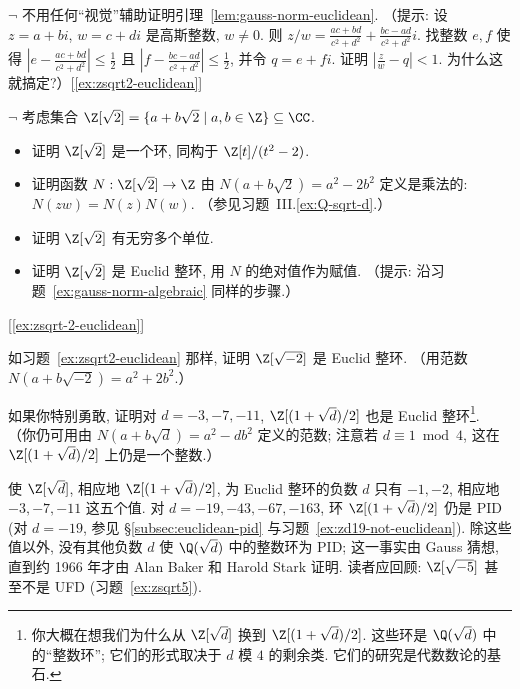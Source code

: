 \begin{prob}
\label{ex:gauss-norm-algebraic}
$\neg$ 不用任何``视觉''辅助证明引理~\ref{lem:gauss-norm-euclidean}. （提示: 设 $z=a+bi$, $w=c+di$ 是高斯整数, $w\neq 0$. 则 $z/w=\frac{ac+bd}{c^2+d^2}+\frac{bc-ad}{c^2+d^2}i$. 找整数 $e,f$ 使得 $|e-\frac{ac+bd}{c^2+d^2}|\leq\frac{1}{2}$ 且 $|f-\frac{bc-ad}{c^2+d^2}|\leq\frac{1}{2}$, 并令 $q=e+fi$. 证明 $|\frac{z}{w}-q|<1$. 为什么这就搞定?）[\ref{ex:zsqrt2-euclidean}]
\end{prob}

\begin{prob}
\label{ex:zsqrt2-euclidean}
$\neg$ 考虑集合 $\Z[\sqrt{2}]=\{a+b\sqrt{2}\mid a,b\in\Z\}\subseteq\CC$.
\begin{itemize}
\item 证明 $\Z[\sqrt{2}]$ 是一个环, 同构于 $\Z[t]/(t^2-2)$.
\item 证明函数 $N:\Z[\sqrt{2}]\to\Z$ 由 $N(a+b\sqrt{2})=a^2-2b^2$ 定义是乘法的: $N(zw)=N(z)N(w)$. （参见习题~III.\ref{ex:Q-sqrt-d}.）
\item 证明 $\Z[\sqrt{2}]$ 有无穷多个单位.
\item 证明 $\Z[\sqrt{2}]$ 是 Euclid 整环, 用 $N$ 的绝对值作为赋值. （提示: 沿习题~\ref{ex:gauss-norm-algebraic} 同样的步骤.）
\end{itemize}
[\ref{ex:zsqrt-2-euclidean}]
\end{prob}

\begin{prob}
\label{ex:zsqrt-2-euclidean}
如习题~\ref{ex:zsqrt2-euclidean} 那样, 证明 $\Z[\sqrt{-2}]$ 是 Euclid 整环. （用范数 $N(a+b\sqrt{-2})=a^2+2b^2$.）

如果你特别勇敢, 证明对 $d=-3,-7,-11$, $\Z[(1+\sqrt{d})/2]$ 也是 Euclid 整环\footnote{你大概在想我们为什么从 $\Z[\sqrt{d}]$ 换到 $\Z[(1+\sqrt{d})/2]$. 这些环是 $\Q(\sqrt{d})$ 中的``整数环''; 它们的形式取决于 $d$ 模 $4$ 的剩余类. 它们的研究是代数数论的基石.}. （你仍可用由 $N(a+b\sqrt{d})=a^2-db^2$ 定义的范数; 注意若 $d\equiv 1\bmod 4$, 这在 $\Z[(1+\sqrt{d})/2]$ 上仍是一个整数.）

使 $\Z[\sqrt d]$, 相应地 $\Z[(1+\sqrt d)/2]$, 为 Euclid 整环的负数 $d$ 只有 $-1,-2$, 相应地 $-3,-7,-11$ 这五个值. 对 $d=-19,-43,-67,-163$, 环 $\Z[(1+\sqrt d)/2]$ 仍是 PID (对 $d=-19$, 参见 \S\ref{subsec:euclidean-pid} 与习题~\ref{ex:zd19-not-euclidean}). 除这些值以外, 没有其他负数 $d$ 使 $\Q(\sqrt d)$ 中的整数环为 PID; 这一事实由 Gauss 猜想, 直到约 1966 年才由 Alan Baker 和 Harold Stark 证明. 读者应回顾: $\Z[\sqrt{-5}]$ 甚至不是 UFD (习题~\ref{ex:zsqrt5}).
\end{prob}

